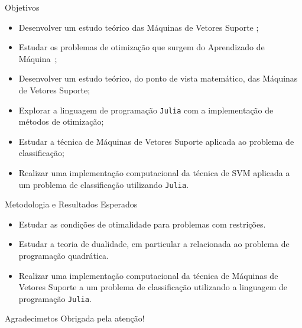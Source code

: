 \documentclass{beamer}
\theoremstyle{definition}%
\begin{document}
\begin{frame}{Objetivos}
\begin{itemize}
	\item Desenvolver um estudo teórico das Máquinas de Vetores Suporte \cite{Faisal2019,Evelin2017};

	\item Estudar os problemas de otimização que surgem do Aprendizado de Máquina~\cite{Ana1994,Ademir2013};

	\item Desenvolver um estudo teórico, do ponto de vista matemático, das Máquinas de Vetores Suporte;

	\item Explorar a linguagem de programação \texttt{Julia} com a implementação de métodos de otimização;

	\item Estudar a técnica de Máquinas de Vetores Suporte aplicada ao problema de classificação; 

	\item Realizar uma implementação computacional da técnica de SVM aplicada a um problema de classificação utilizando \texttt{Julia}.
\end{itemize}
\end{frame}


\begin{frame}{Metodologia e Resultados Esperados}
\begin{itemize}
	\item Estudar as condições de otimalidade para problemas com restrições.

	\item Estudar a teoria de dualidade, em particular a relacionada ao problema de programação quadrática.

	\item Realizar uma implementação computacional da técnica de Máquinas de Vetores Suporte a um problema de classificação utilizando a linguagem de programação \texttt{Julia}.
\end{itemize}
\end{frame}


\begin{frame}{Agradecimetos}
\centering
\Large{Obrigada pela atenção!}
\end{frame}


\begin{frame}
\printbibliography
\end{frame}
\end{document}
